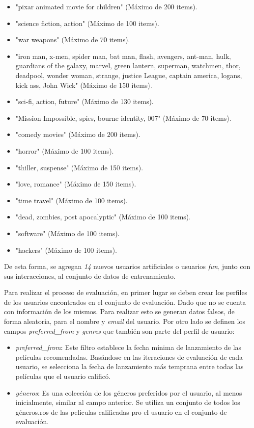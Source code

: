 \documentclass[11pt,a4paper,twoside]{thesis}
\begin{document}
\begin{itemize}
	\item "pixar animated movie for children" (Máximo de 200 items).
	\item "science fiction, action" (Máximo de 100 items).
	\item "war weapons" (Máximo de 70 items).
	\item "iron man, x-men, spider man, bat man, flash, avengers, ant-man, hulk, guardians of the galaxy, marvel, green lantern, superman, watchmen, thor, deadpool, wonder woman, strange, justice League, captain america, logans, kick ass, John Wick" (Máximo de 150 items).
	\item "sci-fi, action, future" (Máximo de 130 items).
	\item "Mission Impossible, spies, bourne identity, 007" (Máximo de 70 items).
	\item "comedy movies" (Máximo de 200 items).
	\item "horror" (Máximo de 100 items).
	\item "thiller, suspense" (Máximo de 150 items).
	\item "love, romance" (Máximo de 150 items).
	\item "time travel" (Máximo de 100 items).
	\item "dead, zombies, post apocalyptic" (Máximo de 100 items).
	\item "software" (Máximo de 100 items).
	\item "hackers" (Máximo de 100 items).
\end{itemize}

De esta forma, se agregan \textit{14} nuevos usuarios artificiales o usuarios \textit{fun}, junto con sus interacciones, al conjunto de datos de entrenamiento.

Para realizar el proceso de evaluación, en primer lugar se deben crear los perfiles de los usuarios encontrados en el conjunto de evaluación. Dado que no se cuenta con información de los mismos. Para realizar esto se generan datos falsos, de forma aleatoria, para el nombre y \textit{email} del usuario. Por otro lado se definen los campos \textit{preferred\_from} y
\textit{genres} que también son parte del perfil de usuario:


\begin{itemize}
	\item \textit{preferred\_from}: Este filtro establece la fecha mínima de lanzamiento de las películas recomendadas. Basándose en las iteraciones de evaluación de cada usuario, se selecciona la fecha de lanzamiento más temprana entre todas las películas que el usuario calificó.
	\item \textit{géneros}: Es una colección de los géneros preferidos por el usuario, al menos inicialmente, similar al campo anterior. Se utiliza un conjunto de todos los géneros.ros de las películas calificadas pro el usuario en el conjunto de evaluación.
\end{itemize}
\end{document}
